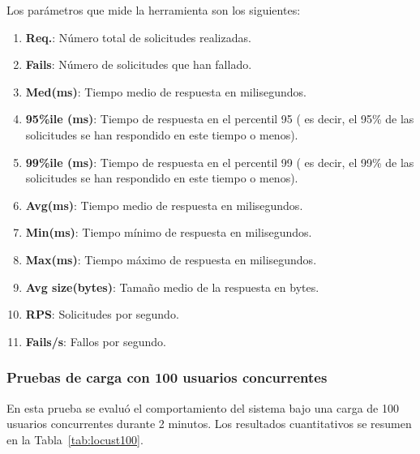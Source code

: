 Los parámetros que mide la herramienta son los siguientes:
\begin{enumerate}
    \item \textbf{Req.}: Número total de solicitudes realizadas.
    \item \textbf{Fails}: Número de solicitudes que han fallado.
    \item \textbf{Med(ms)}: Tiempo medio de respuesta en milisegundos.
    \item \textbf{95\%ile (ms)}: Tiempo de respuesta en el percentil 95 ( es decir, el 95\% de las solicitudes se han respondido en este tiempo o menos).
    \item \textbf{99\%ile (ms)}: Tiempo de respuesta en el percentil 99 ( es decir, el 99\% de las solicitudes se han respondido en este tiempo o menos).
    \item \textbf{Avg(ms)}: Tiempo medio de respuesta en milisegundos.
    \item \textbf{Min(ms)}: Tiempo mínimo de respuesta en milisegundos.
    \item \textbf{Max(ms)}: Tiempo máximo de respuesta en milisegundos.
    \item \textbf{Avg size(bytes)}: Tamaño medio de la respuesta en bytes.
    \item \textbf{RPS}: Solicitudes por segundo.
    \item \textbf{Fails/s}: Fallos por segundo.
\end{enumerate}

\subsubsection{Pruebas de carga con 100 usuarios concurrentes}

En esta prueba se evaluó el comportamiento del sistema bajo una carga de 100 usuarios concurrentes durante 2 minutos. Los resultados cuantitativos se resumen en la Tabla~\ref{tab:locust100}.

\begin{table}[H]
\centering
{}
\caption{Resultados de la prueba de carga con 100 usuarios concurrentes.}
\label{tab:locust100}
\end{table}

